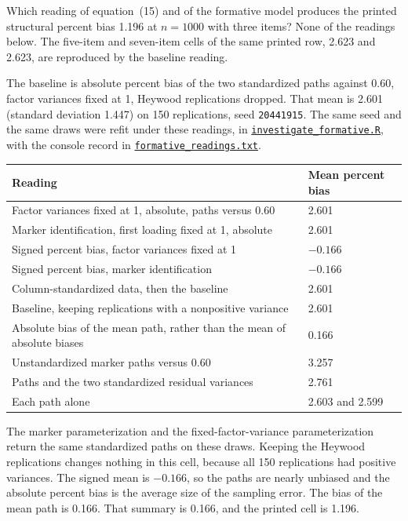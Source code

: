 \documentclass[11pt]{article}
\gdef\linkform{\href{https://github.com/alectionary/vibe-math/blob/master/formalization/chumney-sem-small-samples/simulation/investigate_formative.R}{\texttt{investigate\_formative.R}}}
\gdef\linkformout{\href{https://github.com/alectionary/vibe-math/blob/master/formalization/chumney-sem-small-samples/simulation/out/formative_readings.txt}{\texttt{formative\_readings.txt}}}
\begin{document}
Which reading of equation~(15) and of the formative model produces the
printed structural percent bias 1.196 at $n=1000$ with three items? None of
the readings below. The five-item and seven-item cells of the same printed
row, 2.623 and 2.623, are reproduced by the baseline reading.

The baseline is absolute percent bias of the two standardized paths against
0.60, factor variances fixed at 1, Heywood replications dropped. That mean
is 2.601 (standard deviation 1.447) on 150 replications, seed
\texttt{20441915}. The same seed and the same draws were refit under these
readings, in \linkform, with the
console record in \linkformout.

\begin{center}
\small
\setlength{\tabcolsep}{4pt}
\begin{tabular}{@{}p{}p{}@{}}
\toprule
Reading & Mean percent bias \\
\midrule
Factor variances fixed at 1, absolute, paths versus 0.60 & 2.601 \\
Marker identification, first loading fixed at 1, absolute & 2.601 \\
Signed percent bias, factor variances fixed at 1 & $-0.166$ \\
Signed percent bias, marker identification & $-0.166$ \\
Column-standardized data, then the baseline & 2.601 \\
Baseline, keeping replications with a nonpositive variance & 2.601 \\
Absolute bias of the mean path, rather than the mean of absolute biases & 0.166 \\
Unstandardized marker paths versus 0.60 & 3.257 \\
Paths and the two standardized residual variances & 2.761 \\
Each path alone & 2.603 and 2.599 \\
\bottomrule
\end{tabular}
\end{center}

The marker parameterization and the fixed-factor-variance parameterization
return the same standardized paths on these draws. Keeping the Heywood
replications changes nothing in this cell, because all 150 replications
had positive variances. The signed mean is $-0.166$, so the paths are
nearly unbiased and the absolute percent bias is the average size of the
sampling error. The bias of the mean path is 0.166. That summary is 0.166, and the
printed cell is 1.196.
\end{document}

